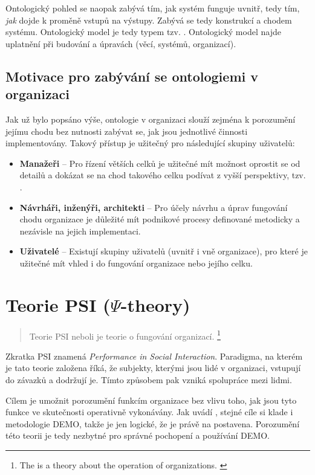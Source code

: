 Ontologický pohled se naopak zabývá tím, jak systém funguje uvnitř, tedy tím, \textit{jak} dojde k proměně vstupů na výstupy. Zabývá se tedy konstrukcí a chodem systému. Ontologický model je tedy typem tzv. . Ontologický model najde uplatnění při budování a úpravách (věcí, systémů, organizací).

\subsection{Motivace pro zabývání se ontologiemi v organizaci}
Jak už bylo popsáno výše, ontologie v organizaci slouží zejména k porozumění jejímu chodu bez nutnosti zabývat se, jak jsou jednotlivé činnosti implementovány. Takový přístup je užitečný pro následující skupiny uživatelů: \cite{Dietz2005}

\begin{itemize}
\item \textbf{Manažeři} – Pro řízení větších celků je užitečné mít možnost oprostit se od detailů a dokázat se na chod takového celku podívat z vyšší perspektivy, tzv. .
\item \textbf{Návrháři, inženýři, architekti} – Pro účely návrhu a úprav fungování chodu organizace je důležité mít podnikové procesy definované metodicky a nezávisle na jejich implementaci.
\item \textbf{Uživatelé} – Existují skupiny uživatelů (uvnitř i vně organizace), pro které je užitečné mít vhled i do fungování organizace nebo jejího celku.
\end{itemize}

\section{Teorie PSI ($\Psi$-theory)}

\begin{quote}
Teorie PSI neboli \ptheory  je teorie o fungování organizací. \cite{Dietz2005}
\footnote{The \ptheory is a theory about the operation of organizations. \cite{Dietz2005}}
\end{quote}

Zkratka PSI znamená \textit{Performance in Social Interaction}. Paradigma, na kterém je tato teorie založena říká, že subjekty, kterými jsou lidé v organizaci, vstupují do závazků a dodržují je. Tímto způsobem pak vzniká spolupráce mezi lidmi. 

Cílem \ptheory je umožnit porozumění funkcím
organizace bez vlivu toho, jak jsou tyto funkce ve skutečnosti operativně vykonávány. Jak uvádí \cite{Vejrazkova2013}, stejné cíle si klade i metodologie DEMO, takže je jen logické, že je právě na \ptheory postavena. Porozumění této teorii je tedy nezbytné pro správné pochopení a používání DEMO.

